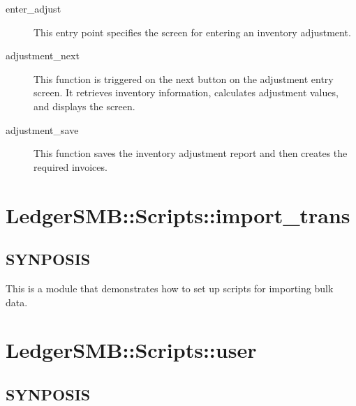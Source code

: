 \begin{description}
\begin{description}
\item[{enter\_adjust}] \mbox{}

This entry point specifies the screen for entering an inventory adjustment.

\end{description}
\begin{description}

\item[{adjustment\_next}] \mbox{}

This function is triggered on the next button on the adjustment entry screen.
It retrieves inventory information, calculates adjustment values, and displays the
screen.

\end{description}
\begin{description}

\item[{adjustment\_save}] \mbox{}

This function saves the inventory adjustment report and then creates the required
invoices.

\end{description}
\section{LedgerSMB::Scripts::import\_trans\label{LedgerSMB::Scripts::import_trans}}




\subsection*{SYNPOSIS\label{LedgerSMB::Scripts::import_trans_SYNPOSIS}}


This is a module that demonstrates how to set up scripts for importing bulk 
data.

\section{LedgerSMB::Scripts::user\label{LedgerSMB::Scripts::user}}




\subsection*{SYNPOSIS\label{LedgerSMB::Scripts::user_SYNPOSIS}}



\end{description}
